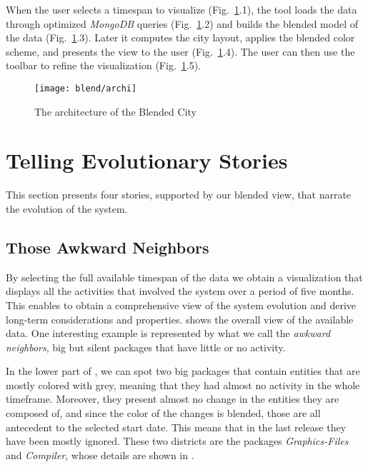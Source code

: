 When the user selects a timespan to visualize (Fig.~\ref{fig:archi}.1), the tool loads the data through optimized \textit{MongoDB} queries  (Fig.~\ref{fig:archi}.2) and builds the blended model of the data  (Fig.~\ref{fig:archi}.3).
Later it computes the city layout, applies the blended color scheme, and presents the view to the user (Fig.~\ref{fig:archi}.4).
The user can then use the toolbar to refine the visualization (Fig.~\ref{fig:archi}.5).

\begin{figure}[!ht]
\centering
\texttt{[image: blend/archi]}
\caption{The architecture of the Blended City}
\label{fig:archi}
\end{figure}



\section{Telling Evolutionary Stories}\label{sec:blend-stories}

This section presents four stories, supported by our blended view, that narrate the evolution of the \pha system.


\subsection{Those Awkward Neighbors}

By selecting the full available timespan of the data we obtain a visualization that displays all the activities that involved the \pha system over a period of five months.
This enables to obtain a comprehensive view of the system evolution and derive long-term considerations and properties.
 shows the overall view of the available data.
One interesting example is represented by what we call the \emph{awkward neighbors}, \ie big but silent packages that have little or no activity.

In the lower part of , we can spot two big packages that contain entities that are mostly colored with grey, meaning that they had almost no activity in the whole timeframe.
Moreover, they present almost no change in the entities they are composed of, and since the color of the changes is blended, those are all antecedent to the selected start date.
This means that in the last release they have been mostly ignored.
These two districts are the packages \textit{Graphics-Files} and \textit{Compiler}, whose details are shown in .

